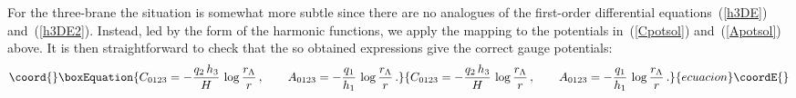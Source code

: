 \documentclass[a4paper,11pt]{article}
\providecommand{\eqref}[1]{(\ref{#1})}
\begin{document}
For the three-brane the situation is somewhat more subtle since
there are no analogues of the first-order differential
equations~\eqref{h3DE} and~\eqref{h3DE2}. Instead, led by the
form of the harmonic functions, we apply the mapping
\coordHE{} to the potentials
in~\eqref{Cpotsol} and~\eqref{Apotsol} above. It is then
straightforward to check that the so obtained expressions
give the correct gauge potentials:
%
\begin{equation}\coord{}\boxEquation{
C_{0123} = - \frac{q_2\,h_3}{H}\,\log\frac{r_\Lambda}{r} \spa
A_{0123} = - \frac{q_1}{h_1}\,\log\frac{r_\Lambda}{r} \,.
}{
C_{0123} = - \frac{q_2\,h_3}{H}\,\log\frac{r_\Lambda}{r} \spa
A_{0123} = - \frac{q_1}{h_1}\,\log\frac{r_\Lambda}{r} \,.
}{ecuacion}\coordE{}\end{equation}
\end{document}
